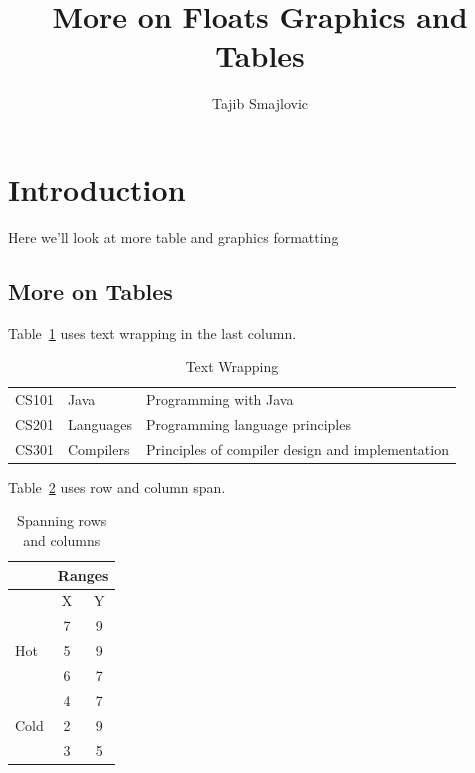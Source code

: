 \documentclass{proc}
\title{ More on Floats Graphics and Tables}
\author{Tajib Smajlovic}
\date{}
\begin{document}
	
	\maketitle
	
	\section{Introduction}
	Here we'll look at more table and graphics formatting
	
	
	\subsection{More on Tables}
	Table~\ref{tab:wrapping} uses text wrapping in the last column.
	
	\begin{table}[htbp]
		\caption{Text Wrapping}
		\begin{center}
			\begin{tabular}{| l | l | p{3cm} |}
				\hline
				CS101 & Java & Programming with Java \\
				CS201 & Languages & Programming language principles\\
				CS301 & Compilers & Principles of compiler design and implementation \\
				\hline
			\end{tabular}
		\end{center}
	\label{tab:wrapping}
	\end{table}
	
	Table~\ref{tab:multi} uses row and column span.
	
	\begin{table}[htbp]
		\caption{Spanning rows and columns}
		\begin{center}
			\begin{tabular}{| l | c | c |}
				& \multicolumn{2}{c|}{Ranges} \\
				\hline
				& X & Y\\
				\hline
				\multirow{3}{*}{Hot} & 7 & 9\\
				& 5 & 9\\
				& 6 & 7\\
				\hline
				\multirow{3}{*}{Cold}& 4 & 7\\
				& 2 & 9\\
				& 3 & 5\\
				\hline
			\end{tabular}
		\end{center}
		\label{tab:multi}
	\end{table}
	
\end{document}
